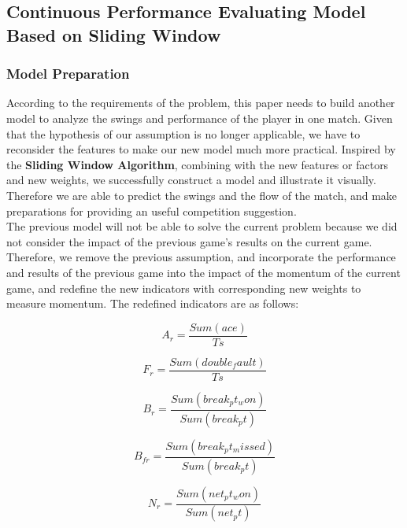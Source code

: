 \documentclass{mcmthesis}
\begin{document}
\subsection{Continuous Performance Evaluating Model Based on Sliding Window}

\subsubsection{Model Preparation}
According to the requirements of the problem, this paper needs to build another model to
analyze the swings and performance of the player in one match. Given that the hypothesis of our
assumption is no longer applicable, we have to reconsider the features to make our new model
much more practical. Inspired by the {\bf Sliding Window Algorithm}, combining with the new
features or factors and new weights, we successfully construct a model and illustrate it visually. Therefore we are able to predict the swings and the flow of the match, and make preparations for
providing an useful competition suggestion.\\
 The previous model will not be able to solve the current problem because we did not consider
the impact of the previous game's results on the current game. Therefore, we remove the previous
assumption, and incorporate the performance and results of the previous game into the impact of
the momentum of the current game, and redefine the new indicators with corresponding new
weights to measure momentum. The redefined indicators are as follows:

\begin{equation} \label{7}
    A_{r}=\frac{Sum(ace)}{Ts}
\end{equation}

\begin{equation} \label{8}
    F_{r}=\frac{Sum(double_fault)}{Ts}
\end{equation}

\begin{equation} \label{9}
    B_{r}=\frac{Sum(break_pt_won)}{Sum(break_pt)}
\end{equation}

\begin{equation} \label{10}
    B_{fr}=\frac{Sum(break_pt_missed)}{Sum(break_pt)}
\end{equation}

\begin{equation} \label{11}
    N_{r}=\frac{Sum(net_pt_won)}{Sum(net_pt)}
\end{equation}
\end{document}
